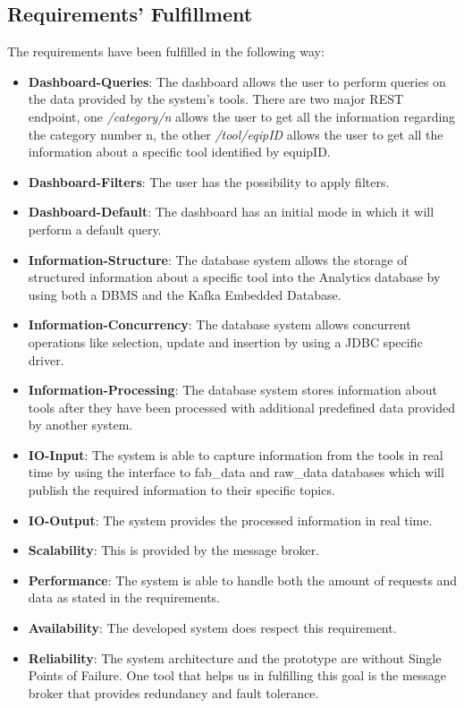 \subsection{Requirements' Fulfillment}
The requirements have been fulfilled in the following way:
\begin{itemize}
    \item \textbf{Dashboard-Queries}: The dashboard allows the user to perform queries on the data provided by the system's tools. There are two major REST endpoint, one \textit{/category/{n}} allows the user to get all the information regarding the category number {n}, the other \textit{/tool/{eqipID}} allows the user to get all the information about a specific tool identified by equipID. 
    \item \textbf{Dashboard-Filters}: The user has the possibility to apply filters.
    \item \textbf{Dashboard-Default}: The dashboard has an initial mode in which it will perform a default query.
    \item \textbf{Information-Structure}: The database system allows the storage of structured information about a specific tool into the Analytics database by using both a DBMS and the Kafka Embedded Database.
    \item \textbf{Information-Concurrency}: The database system allows concurrent operations like selection, update and insertion by using a JDBC specific driver.
    \item \textbf{Information-Processing}: The database system stores information about tools after they have been processed with additional predefined data provided by another system.
    \item \textbf{IO-Input}: The system is able to capture information from the tools in real time by using the interface to fab\_data and raw\_data databases which will publish the required information to their specific topics.
    \item \textbf{IO-Output}: The system provides the processed information in real time.
     \item \textbf{Scalability}: This is provided by the message broker.
    \item \textbf{Performance}:  The system is able to handle both the amount of requests and data as stated in the requirements.
    \item \textbf{Availability}: The developed system does respect this requirement.
    \item \textbf{Reliability}: The system architecture and the prototype are without Single Points of Failure. One tool that helps us in fulfilling this goal is the message broker that provides redundancy and fault tolerance.
\end{itemize}



